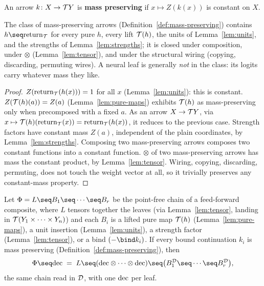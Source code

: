 \begin{definition}
\label{def:mass-preserving}
\leanok
An arrow $k \colon X \to \mathcal T Y$ is \textbf{mass preserving} if
$x \mapsto Z(k(x))$ is constant on $X$.
\end{definition}

\begin{lemma}
\label{lem:mass-preserving-closure}
\leanok
The class of mass-preserving arrows (Definition~\ref{def:mass-preserving})
contains $h \seq \Ret_{\Tmon}$ for every pure $h$, every lift
$\mathcal T(h)$, the units of Lemma~\ref{lem:units}, and the strengths of
Lemma~\ref{lem:strengths}; it is closed under composition, under
$\otimes$ (Lemma~\ref{lem:tensor}), and under the structural wiring
(copying, discarding, permuting wires). A neural leaf is generally
\emph{not} in the class: its logits carry whatever mass they like.
\end{lemma}

\begin{proof}
\leanok
$Z(\mathrm{return}_{\mathcal T}(h(x))) = 1$ for all $x$ (Lemma~\ref{lem:units}): this
is constant. $Z(\mathcal T(h)(a)) = Z(a)$ (Lemma~\ref{lem:pure-maps})
exhibits $\mathcal T(h)$ as mass-preserving only when precomposed with a
fixed $a$. As an arrow $X \to \mathcal T Y$, via
$x \mapsto \mathcal T(h)(\mathrm{return}_{\mathcal T}(x)) = \mathrm{return}_{\mathcal T}(h(x))$, it reduces
to the previous case. Strength factors have constant mass $Z(a)$,
independent of the plain coordinates, by Lemma~\ref{lem:strengths}.
Composing two mass-preserving arrows composes two constant functions
into a constant function. $\otimes$ of two mass-preserving arrows has
mass the constant product, by Lemma~\ref{lem:tensor}. Wiring, copying,
discarding, permuting, does not touch the weight vector at all, so it
trivially preserves any constant-mass property.
\end{proof}

\begin{theorem}
\label{thm:pullout}
\leanok
Let $\Phi = L \seq B_1 \seq \cdots \seq B_r$ be the point-free chain
of a feed-forward composite, where $L$ tensors together the leaves
(via Lemma~\ref{lem:tensor}, landing in $\mathcal T(Y_1\times\cdots\times
Y_n)$) and each $B_i$ is a lifted pure map $\mathcal T(h)$
(Lemma~\ref{lem:pure-maps}), a unit insertion
(Lemma~\ref{lem:units}), a strength factor
(Lemma~\ref{lem:tensor}), or a bind $({-}\bind k_i)$. If every
bound continuation $k_i$ is mass preserving
(Definition~\ref{def:mass-preserving}), then
\[
  \Phi \seq \dec \;=\;
  L \seq (\dec \otimes \cdots \otimes \dec) \seq
  \bigl(B_1^{\Dmon} \seq \cdots \seq B_r^{\Dmon}\bigr),
\]
the same chain read in $\mathcal D$, with one $\mathrm{dec}$ per leaf.
\end{theorem}

